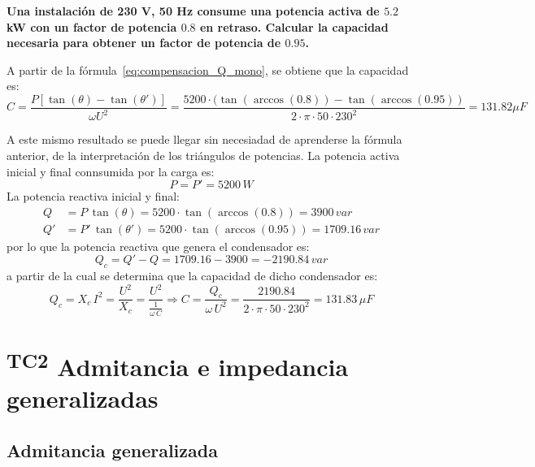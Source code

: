 \begin{example}\label{ex.condensador_Q}
  \textbf{Una instalación de 230 V, 50 Hz consume una potencia activa
    de $5.2$ kW con un factor de potencia $0.8$ en retraso. Calcular
    la capacidad necesaria para obtener un factor de potencia de
    $0.95$.}
	    
  A partir de la fórmula~\eqref{eq:compensacion_Q_mono}, se obtiene
  que la capacidad es:
  \begin{equation*}
    C=\frac{P \left[\tan (\theta) - \tan (\theta')\right]}{\omega U^2}=\dfrac{5200\cdot(\tan(\arccos(0.8))-\tan(\arccos(0.95))}{2\cdot\pi\cdot 50\cdot 230^2}=131.82\mu F
  \end{equation*}
	    
  A este mismo resultado se puede llegar sin necesiadad de aprenderse
  la fórmula anterior, de la interpretación de los triángulos de
  potencias. La potencia activa inicial y final connsumida por la
  carga es:
  \begin{equation*}
    P=P'=5200\,W
  \end{equation*}
  La potencia reactiva inicial y final:
  \begin{align*}
    Q&=P\,\tan(\theta)=5200\cdot\tan(\arccos(0.8))=3900\,var\\
    Q'&=P'\,\tan(\theta')=5200\cdot\tan(\arccos(0.95))=1709.16\,var
  \end{align*}
  por lo que la potencia reactiva que genera el condensador es:
  \begin{equation*}
    Q_c=Q'-Q=1709.16-3900=-2190.84\,var
  \end{equation*}
  a partir de la cual se determina que la capacidad de dicho
  condensador es:
  \begin{equation*}
    Q_c=X_c\,I^2=\dfrac{U^2}{X_c}=\dfrac{U^2}{\frac{1}{\omega\,C}}\Rightarrow C=\dfrac{Q_c}{\omega\,U^2}=\dfrac{2190.84}{2\cdot\pi\cdot 50\cdot 230^2}=131.83\,\mu F
  \end{equation*}
\end{example}
	
\section{\textsuperscript{TC2} Admitancia e impedancia generalizadas}
\label{sec:admitancia-impedancia-generalizada}

\subsection{Admitancia generalizada}
\label{sec:admitancia-generalizada}

